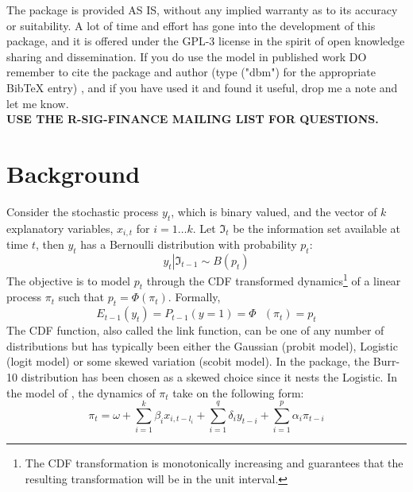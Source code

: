 The package is provided AS IS, without any implied warranty as to its accuracy
or suitability. A lot of time and effort has gone into the development of this
package, and it is offered under the GPL-3 license in the spirit of open
knowledge sharing and dissemination. If you do use the model in published work
DO remember to cite the package and author (type \verb@citation@("dbm") for
the appropriate BibTeX entry) , and if you have used it and found it
useful, drop me a note and let me know.\\

\textbf{USE THE R-SIG-FINANCE MAILING LIST FOR QUESTIONS.}
\section{Background}\label{sec:background}
Consider the stochastic process $y_t$, which is binary valued, and the vector of $k$ explanatory variables,
$x_{i,t}$ for $i=1\ldots k$. Let $\Im_t$ be the information set available at time $t$, then $y_t$
has a Bernoulli distribution with probability $p_t$:
\begin{equation}
{y_t}\left| {{\Im _{t - 1}} \sim B\left( {{p_t}} \right)} \right.
\end{equation}
The objective is to model $p_t$ through the CDF transformed dynamics\footnote{The CDF transformation is monotonically increasing and
guarantees that the resulting transformation will be in the unit interval.}  of a linear process $\pi_t$ such that ${p_t} = \Phi \left( {{\pi _t}} \right)$.
Formally,
\begin{equation}
{E_{t - 1}}\left( {{y_t}} \right) = {P_{t - 1}}\left( {y = 1} \right) = \Phi {\text{ }}\left( {{\pi _t}} \right) = {p_t}
\end{equation}
The CDF function, also called the link function, can be one of any number of distributions but has typically been either the Gaussian (probit model),
Logistic (logit model) or some skewed variation (scobit model). In the \verb@dbm@ package, the Burr-10 distribution has been chosen as a skewed choice since
it nests the Logistic. In the model of \cite{Kauppi2008}, the dynamics of $\pi_t$ take on the following form:
\begin{equation}\label{eq:dbm}
{\pi _t} = \omega  + \sum\limits_{i = 1}^k {{\beta _i}{x_{i,t - {l_i}}}}  + \sum\limits_{i = 1}^q {{\delta _i}{y_{t - i}}}  + \sum\limits_{i = 1}^p {{\alpha _i}{\pi _{t - i}}}
\end{equation}
